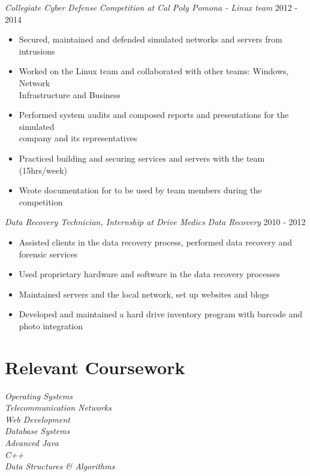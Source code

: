 \documentclass[line]{docs/resume/res}
\begin{document}
\begin{resume}
  {\sl Collegiate Cyber Defense Competition at Cal Poly Pomona - Linux team} \hfill 2012 - 2014
  \begin{itemize} \itemsep -2pt
    \item Secured, maintained and defended simulated networks and servers from intrusions
    \item Worked on the Linux team and collaborated with other teams: Windows, Network \\
      Infrastructure and Business
    \item Performed system audits and composed reports and presentations for the simulated \\
      company and its representatives
    \item Practiced building and securing services and servers with the team (15hrs/week)
    \item Wrote documentation for to be used by team members during the competition
  \end{itemize}

  {\sl Data Recovery Technician, Internship at Drive Medics Data Recovery} \hfill 2010 - 2012
  \begin{itemize} \itemsep -2pt
    \item Assisted clients in the data recovery process, performed data recovery and \\
      forensic services
    \item Used proprietary hardware and software in the data recovery processes
    \item Maintained servers and the local network, set up websites and blogs
    \item Developed and maintained a hard drive inventory program with barcode and \\
      photo integration
  \end{itemize}

\section{Relevant Coursework}
  {\sl Operating Systems } \\
  {\sl Telecommunication Networks } \\
  {\sl Web Development } \\
  {\sl Database Systems } \\
  {\sl Advanced Java} \\
  {\sl C++} \\
  {\sl Data Structures \& Algorithms}


\end{resume}
\end{document}
